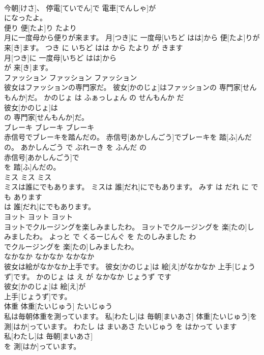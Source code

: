 \documentclass[8pt]{extreport}
\begin{document}
\begin{CJK}{UTF8}{min}
\\	今朝[けさ]、 停電[ていでん]で 電車[でんしゃ]が
\\	になったよ。			
\\	便り	便[たよ]り	たより	
\\	月に一度母から便りが来ます。	月[つき]に 一度母[いちど はは]から 便[たよ]りが 来[き]ます。	つき に いちど はは から たより が きます	
\\	月[つき]に 一度母[いちど はは]から
\\	が 来[き]ます。			
\\	ファッション	ファッション	ファッション	
\\	彼女はファッションの専門家だ。	彼女[かのじょ]はファッションの 専門家[せんもんか]だ。	かのじょ は ふぁっしょん の せんもんか だ	
\\	彼女[かのじょ]は
\\	の 専門家[せんもんか]だ。			
\\	ブレーキ	ブレーキ	ブレーキ	
\\	赤信号でブレーキを踏んだの。	赤信号[あかしんごう]でブレーキを 踏[ふ]んだの。	あかしんごう で ぶれーき を ふんだ の	
\\	赤信号[あかしんごう]で
\\	を 踏[ふ]んだの。			
\\	ミス	ミス	ミス	
\\	ミスは誰にでもあります。	ミスは 誰[だれ]にでもあります。	みす は だれ に で も あります	
\\	は 誰[だれ]にでもあります。			
\\	ヨット	ヨット	ヨット	
\\	ヨットでクルージングを楽しみましたわ。	ヨットでクルージングを 楽[たの]しみましたわ。	よっと で くるーじんぐ を たのしみました わ	
\\	でクルージングを 楽[たの]しみましたわ。			
\\	なかなか	なかなか	なかなか	
\\	彼女は絵がなかなか上手です。	彼女[かのじょ]は 絵[え]がなかなか 上手[じょうず]です。	かのじょ は え が なかなか じょうず です	
\\	彼女[かのじょ]は 絵[え]が
\\	上手[じょうず]です。			
\\	体重	体重[たいじゅう]	たいじゅう	
\\	私は毎朝体重を測っています。	私[わたし]は 毎朝[まいあさ] 体重[たいじゅう]を 測[はか]っています。	わたし は まいあさ たいじゅう を はかって います	
\\	私[わたし]は 毎朝[まいあさ]
\\	を 測[はか]っています。			

\end{CJK}
\end{document}
